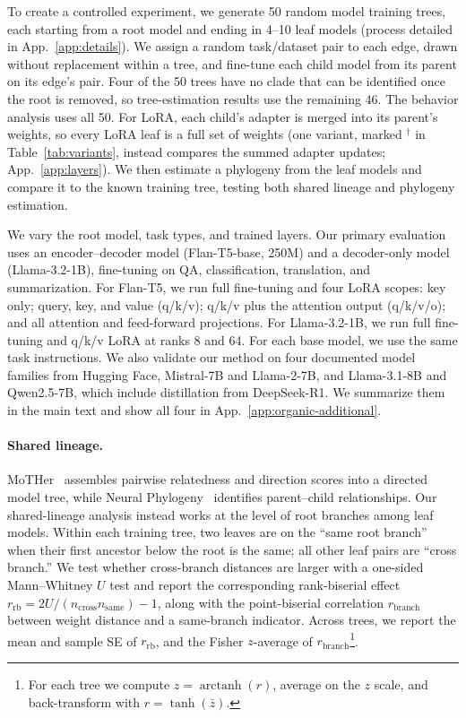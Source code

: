 \documentclass{article}
\theoremstyle{definition}
\theoremstyle{plain}
\newif\ifrevision
\newcommand{\rev}[1]{\ifrevision{\color{blue}#1}\else#1\fi}
\newcommand{\revtag}[1]{\ifrevision\textsuperscript{\color{blue}\sffamily\scriptsize[#1]}\fi}
\begin{document}
To create a controlled experiment, we generate 50 random model training trees, each starting from a root
model and ending in 4--10 leaf models (process detailed in App.~\ref{app:details}). We assign a random task/dataset pair to each edge\rev{, drawn without replacement within a tree,}\revtag{tWEn W1} and fine-tune each child model from its parent on its edge's pair. Four of the 50 trees have no clade that can be identified once the root is removed, so tree-estimation results use the remaining 46. The behavior analysis uses all 50. For LoRA, each child's adapter is merged into its parent's weights, so every LoRA leaf is a full set of weights (one variant, marked $^\dagger$ in Table~\ref{tab:variants}, instead compares the summed adapter updates; App.~\ref{app:layers}). We then estimate a phylogeny from the leaf models and compare it to the known training tree, testing both shared
lineage and phylogeny estimation.

We vary the root model, task types, and trained layers. Our primary evaluation uses an
encoder--decoder model (Flan-T5-base, 250M) and a decoder-only model (Llama-3.2-1B), fine-tuning on
QA, classification, translation, and summarization. For Flan-T5, we run full fine-tuning and four LoRA \citep{hu2022lora}
scopes: key only; query, key, and value (q/k/v); q/k/v plus the attention output (q/k/v/o); and all attention and feed-forward projections.
For Llama-3.2-1B, we run full fine-tuning and q/k/v LoRA at ranks 8 and 64. For each base
model, we use the same task instructions. We also
validate our method on \rev{four}\revtag{S8sV} documented model families from Hugging Face, Mistral-7B and Llama-2-7B\rev{, and Llama-3.1-8B and Qwen2.5-7B, which include distillation from DeepSeek-R1}. We
summarize them in the main text and show \rev{all four} in App.~\ref{app:organic-additional}.

\paragraph{Shared lineage.}
MoTHer~\citep{horwitz2025mother} assembles pairwise relatedness and direction scores into a directed
model tree, while Neural Phylogeny~\citep{yu2025neural} identifies parent--child relationships. Our
shared-lineage analysis instead works at the level of root branches among leaf models. Within each
training tree, two leaves are on the ``same root branch'' when their first ancestor below the root is
the same; all other leaf pairs are ``cross branch.'' We test whether cross-branch distances
are larger with a one-sided Mann--Whitney $U$ test and report the corresponding rank-biserial effect
$r_{\mathrm{rb}}=2U/(n_{\mathrm{cross}}n_{\mathrm{same}})-1$, along with the point-biserial correlation $r_{\mathrm{branch}}$ between weight distance and a same-branch indicator. Across trees, we report the mean and
sample SE of $r_{\mathrm{rb}}$, and the Fisher $z$-average of $r_{\mathrm{branch}}$\footnote{For each tree we
compute $z=\operatorname{arctanh}(r)$, average on the $z$ scale, and back-transform with
$r=\tanh(\bar z)$.}.
\end{document}
